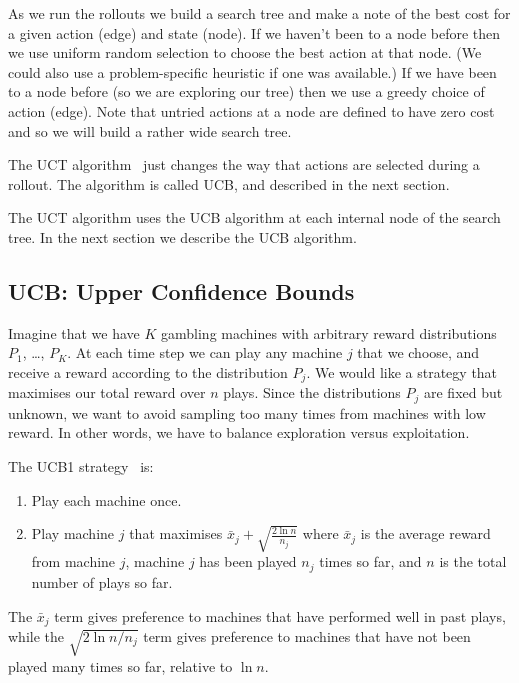 \documentclass[10pt,amstags,fleqn]{article}
\theoremstyle{plain}
\theoremstyle{definition}
\theoremstyle{definition}
\begin{document}
As we run the rollouts we build a search tree and make a note of the
best cost for a given action (edge) and state (node). If we haven't
been to a node before then we use uniform random selection to choose
the best action at that node. (We could also use a problem-specific
heuristic if one was available.)  If we have been to a node before
(so we are exploring our tree) then we use a greedy choice of action
(edge). Note that untried actions at a node are defined to have zero
cost and so we will build a rather wide search tree.

The UCT algorithm~\cite{Kocsis06banditbased} just changes the way that
actions are selected during a rollout. The algorithm is called UCB,
and described in the next section.

The UCT algorithm uses the UCB algorithm at each internal node of
the search tree. In the next section we describe the UCB algorithm.

\subsection{UCB: Upper Confidence Bounds}

Imagine that we have $K$ gambling machines with arbitrary reward
distributions $P_1$, \dots, $P_K$. At each time step we can play
any machine $j$ that we choose, and receive a reward according to
the distribution $P_j$. We would like a strategy that maximises our
total reward over $n$ plays. Since the distributions $P_j$ are fixed
but unknown, we want to avoid sampling too many times from machines
with low reward. In other words, we have to balance exploration versus exploitation.

The UCB1 strategy~\cite{Auer:2002} is:

\begin{enumerate}

\item Play each machine once.

\item Play machine $j$ that maximises $\bar x_j + \sqrt{\frac{2 \ln n}{n_j}}$ where $\bar x_j$ is the average reward from machine $j$, machine $j$ has been played $n_j$ times so far, and $n$ is the total number of plays so far.
\end{enumerate}

The $\bar x_j$ term gives preference to machines that have performed well in
past plays, while the $\sqrt{{2 \ln n}/{n_j}}$ term gives preference
to machines that have not been played many times so far, relative to
$\ln n$.
\end{document}
